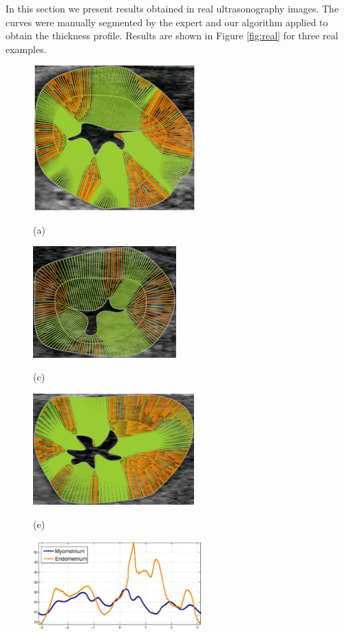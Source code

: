 \documentclass{article}
\begin{document}
In this section we present results obtained in real ultrasonography images. The curves were manually segmented by the expert and our algorithm applied to obtain the thickness profile. Results are shown in Figure \ref{fig:real} for three real examples.

\begin{figure}[t]
\begin{minipage}[b]{.26\linewidth}
  \centering
  \centerline{\includegraphics[width=6.25cm]{pics/real}}
  \centerline{(a)}\medskip
\end{minipage}
\hfill
\begin{minipage}[b]{.33\linewidth}
  \centering
  \centerline{\includegraphics[width=5.5cm]{pics/real4}}
  \centerline{(c)}\medskip
\end{minipage}
\hfill
\begin{minipage}[b]{.33\linewidth}
  \centering
  \centerline{\includegraphics[width=6.2cm]{pics/real3}}
  \centerline{(e)}\medskip
\end{minipage}
\hfill
\begin{minipage}[b]{.33\linewidth}
  \centering
  \centerline{\includegraphics[width=6.5cm]{pics/realWidth}}

\end{minipage}
\end{figure}
\end{document}
